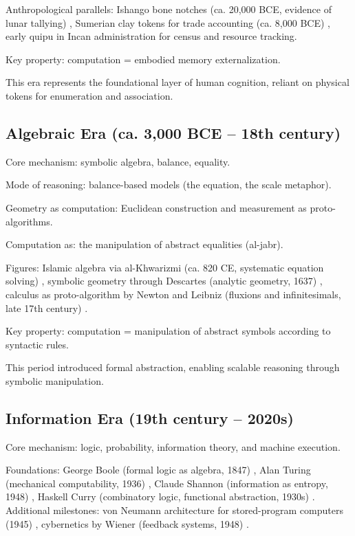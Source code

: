 \documentclass[12pt]{article}
\begin{document}
Anthropological parallels: Ishango bone notches (ca. 20,000 BCE, evidence of lunar tallying) \citep{Pletser1987}, Sumerian clay tokens for trade accounting (ca. 8,000 BCE) \citep{SchmandtBesserat1992}, early quipu in Incan administration for census and resource tracking.

Key property: computation = embodied memory externalization.

This era represents the foundational layer of human cognition, reliant on physical tokens for enumeration and association.

\subsection{Algebraic Era (ca. 3,000 BCE – 18th century)}

Core mechanism: symbolic algebra, balance, equality.

Mode of reasoning: balance-based models (the equation, the scale metaphor).

Geometry as computation: Euclidean construction and measurement as proto-algorithms.

Computation as: the manipulation of abstract equalities (al-jabr).

Figures: Islamic algebra via al-Khwarizmi (ca. 820 CE, systematic equation solving) \citep{AlKhwarizmi825}, symbolic geometry through Descartes (analytic geometry, 1637) \citep{Descartes1637}, calculus as proto-algorithm by Newton and Leibniz (fluxions and infinitesimals, late 17th century) \citep{Newton1687,Leibniz1684}.

Key property: computation = manipulation of abstract symbols according to syntactic rules.

This period introduced formal abstraction, enabling scalable reasoning through symbolic manipulation.

\subsection{Information Era (19th century – 2020s)}

Core mechanism: logic, probability, information theory, and machine execution.

Foundations: George Boole (formal logic as algebra, 1847) \citep{Boole1847}, Alan Turing (mechanical computability, 1936) \citep{Turing1936}, Claude Shannon (information as entropy, 1948) \citep{Shannon1948}, Haskell Curry (combinatory logic, functional abstraction, 1930s) \citep{Curry1930}. Additional milestones: von Neumann architecture for stored-program computers (1945) \citep{VonNeumann1945}, cybernetics by Wiener (feedback systems, 1948) \citep{Wiener1948}.
\end{document}
